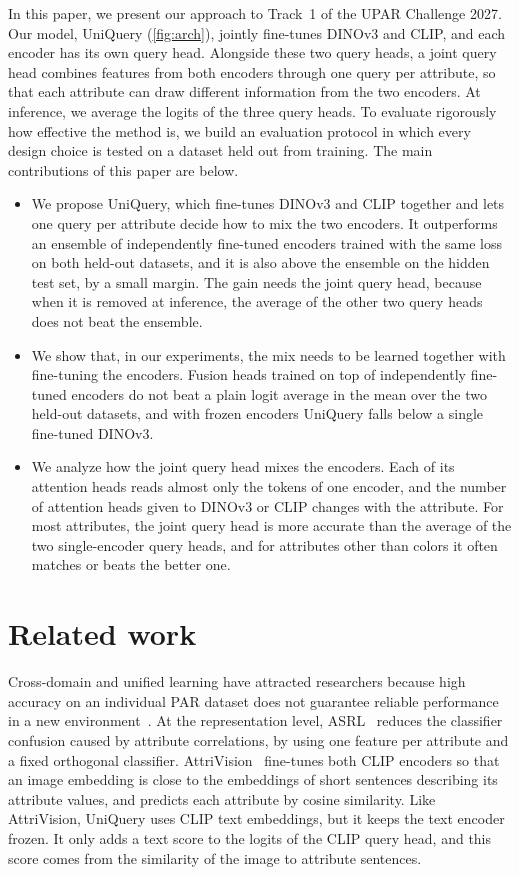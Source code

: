 \documentclass[10pt,twocolumn,letterpaper]{article}
\begin{document}
In this paper, we present our approach to Track~1 of the UPAR Challenge 2027. Our model, UniQuery (\cref{fig:arch}), jointly fine-tunes DINOv3 and CLIP, and each encoder has its own query head. Alongside these two query heads, a joint query head combines features from both encoders through one query per attribute, so that each attribute can draw different information from the two encoders. At inference, we average the logits of the three query heads. To evaluate rigorously how effective the method is, we build an evaluation protocol in which every design choice is tested on a dataset held out from training. The main contributions of this paper are below.
\begin{itemize}
\item We propose UniQuery, which fine-tunes DINOv3 and CLIP together and lets one query per attribute decide how to mix the two encoders. It outperforms an ensemble of independently fine-tuned encoders trained with the same loss on both held-out datasets, and it is also above the ensemble on the hidden test set, by a small margin. The gain needs the joint query head, because when it is removed at inference, the average of the other two query heads does not beat the ensemble.
\item We show that, in our experiments, the mix needs to be learned together with fine-tuning the encoders. Fusion heads trained on top of independently fine-tuned encoders do not beat a plain logit average in the mean over the two held-out datasets, and with frozen encoders UniQuery falls below a single fine-tuned DINOv3.
\item We analyze how the joint query head mixes the encoders. Each of its attention heads reads almost only the tokens of one encoder, and the number of attention heads given to DINOv3 or CLIP changes with the attribute. For most attributes, the joint query head is more accurate than the average of the two single-encoder query heads, and for attributes other than colors it often matches or beats the better one.
\end{itemize}

\section{Related work}
\label{sec:related}

Cross-domain and unified learning have attracted researchers because high accuracy on an individual PAR dataset does not guarantee reliable performance in a new environment~\cite{upar,rethinkpar}. At the representation level, ASRL~\cite{asrl} reduces the classifier confusion caused by attribute correlations, by using one feature per attribute and a fixed orthogonal classifier. AttriVision~\cite{attrivision} fine-tunes both CLIP encoders so that an image embedding is close to the embeddings of short sentences describing its attribute values, and predicts each attribute by cosine similarity. Like AttriVision, UniQuery uses CLIP text embeddings, but it keeps the text encoder frozen. It only adds a text score to the logits of the CLIP query head, and this score comes from the similarity of the image to attribute sentences.
\end{document}
